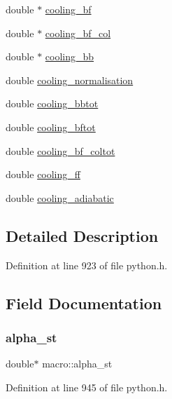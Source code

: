 \begin{DoxyCompactItemize}
\item 
double $\ast$ \hyperlink{structmacro_a28a025132e5524e22892ce363a37988c}{cooling\+\_\+bf}
\item 
double $\ast$ \hyperlink{structmacro_a949003584c6b25a51657f2eb341abee4}{cooling\+\_\+bf\+\_\+col}
\item 
double $\ast$ \hyperlink{structmacro_a344b8e9e0f658f06e2397bd4880caf58}{cooling\+\_\+bb}
\item 
double \hyperlink{structmacro_aa7af4ae4af78ef3c646d7e776275b584}{cooling\+\_\+normalisation}
\item 
double \hyperlink{structmacro_a85eac8200ef941e212d8c6b8d0bbf8cf}{cooling\+\_\+bbtot}
\item 
double \hyperlink{structmacro_ab0671cf0f286d0fc484da2b0894df5bf}{cooling\+\_\+bftot}
\item 
double \hyperlink{structmacro_a6980807d807f7e9e1a49c195e09ce70a}{cooling\+\_\+bf\+\_\+coltot}
\item 
double \hyperlink{structmacro_a8427be6ddfa589b733a30ab12e26daf0}{cooling\+\_\+ff}
\item 
double \hyperlink{structmacro_a8e77cd87d57475d0c53aab45ad0e78cf}{cooling\+\_\+adiabatic}
\end{DoxyCompactItemize}


\subsection{Detailed Description}


Definition at line 923 of file python.\+h.



\subsection{Field Documentation}
\mbox{\label{structmacro_a0e9447fef9f2b3b67cf7ca5a8d8dc4e9}} 
\subsubsection{\texorpdfstring{alpha\+\_\+st}{alpha\_st}}
{\footnotesize\ttfamily double$\ast$ macro\+::alpha\+\_\+st}



Definition at line 945 of file python.\+h.

\mbox{\label{structmacro_ae3484a034eeddcfd15b61073421412ab}} 
